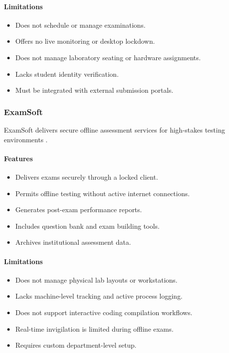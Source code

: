 \paragraph{Limitations}
\begin{itemize}[noitemsep]
\item Does not schedule or manage examinations.
\item Offers no live monitoring or desktop lockdown.
\item Does not manage laboratory seating or hardware assignments.
\item Lacks student identity verification.
\item Must be integrated with external submission portals.
\end{itemize}

\subsubsection{ExamSoft}
ExamSoft delivers secure offline assessment services for high-stakes testing environments \cite{examsoft1}.

\paragraph{Features}
\begin{itemize}[noitemsep]
\item Delivers exams securely through a locked client.
\item Permits offline testing without active internet connections.
\item Generates post-exam performance reports.
\item Includes question bank and exam building tools.
\item Archives institutional assessment data.
\end{itemize}

\paragraph{Limitations}
\begin{itemize}[noitemsep]
\item Does not manage physical lab layouts or workstations.
\item Lacks machine-level tracking and active process logging.
\item Does not support interactive coding compilation workflows.
\item Real-time invigilation is limited during offline exams.
\item Requires custom department-level setup.
\end{itemize}


